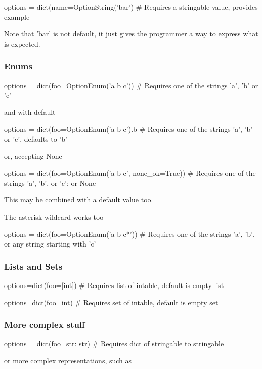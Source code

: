 \begin{python}
  options = dict(name=OptionString('bar')
  # Requires a stringable value, provides example
\end{python}
Note that 'bar' is not default, it just gives the programmer a way to
express what is expected.



\subsubsection*{Enums}
\begin{python}
  options = dict(foo=OptionEnum('a b c'))
  # Requires one of the strings 'a', 'b' or 'c'
\end{python}
and with default

\begin{python}
  options = dict(foo=OptionEnum('a b c').b
   # Requires one of the strings 'a', 'b' or 'c', defaults to 'b'
\end{python}
or, accepting None

\begin{python}
options = dict(foo=OptionEnum('a b c', none_ok=True))
# Requires one of the strings 'a', 'b', or 'c'; or None
\end{python}
This may be combined with a default value too.

The asterisk-wildcard works too

\begin{python}
  options = dict(foo=OptionEnum('a b c*'))
  # Requires one of the strings 'a', 'b', or any string starting with 'c'
\end{python}



\subsubsection*{Lists and Sets}
\begin{python}
options=dict(foo=[int])
# Requires list of intable, default is empty list
\end{python}

\begin{python}
options=dict(foo={int})
# Requires set of intable, default is empty set
\end{python}



\subsubsection*{More complex stuff}
\begin{python}
options = dict(foo={str: str})
# Requires dict of stringable to stringable
\end{python}
or more complex representations, such as

